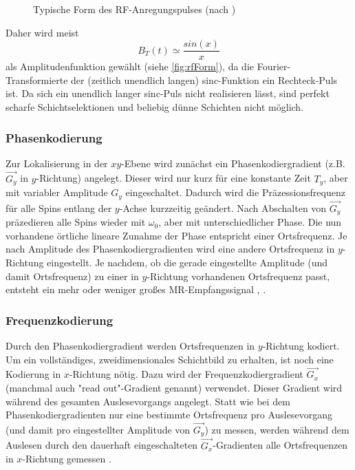 \begin{figure}[H]
	\centering
	\caption[Form des RF-Anregungspulses]{Typische Form des RF-Anregungspulses (nach \cite[S.~326]{Doessel2016})}
	\label{fig:rfForm}
\end{figure}

Daher wird meist
\begin{equation}
	B_T(t) \simeq \frac{sin(x)}{x}
\end{equation}
als Amplitudenfunktion gewählt (siehe \autoref{fig:rfForm}), da die Fourier-Transformierte der (zeitlich unendlich langen) sinc-Funktion ein Rechteck-Puls ist. Da sich ein unendlich langer sinc-Puls nicht realisieren lässt, sind perfekt scharfe Schichtselektionen und beliebig dünne Schichten nicht möglich.

\subsubsection{Phasenkodierung}
Zur Lokalisierung in der $xy$-Ebene wird zunächst ein Phasenkodiergradient (z.B. $\vec{G_y}$ in $y$-Richtung) angelegt. Dieser wird nur kurz für eine konstante Zeit $T_y$, aber mit variabler Amplitude $G_y$ eingeschaltet. Dadurch wird die Präzessionsfrequenz für alle Spins entlang der $y$-Achse kurzzeitig geändert. Nach Abschalten von $\vec{G_y}$ präzedieren alle Spins wieder mit $\omega_0$, aber mit unterschiedlicher Phase. Die nun vorhandene örtliche lineare Zunahme der Phase entspricht einer Ortsfrequenz. Je nach Amplitude des Phasenkodiergradienten wird eine andere Ortsfrequenz in $y$-Richtung eingestellt. Je nachdem, ob die gerade eingestellte Amplitude (und damit Ortsfrequenz) zu einer in $y$-Richtung vorhandenen Ortsfrequenz passt, entsteht ein mehr oder weniger großes MR-Empfangssignal \cite{Bushong2014}, \cite{Edelstein1980}.

\subsubsection{Frequenzkodierung}
Durch den Phasenkodiergradient werden Ortsfrequenzen in $y$-Richtung kodiert. Um ein vollständiges, zweidimensionales Schichtbild zu erhalten, ist noch eine Kodierung in $x$-Richtung nötig. Dazu wird der Frequenzkodiergradient $\vec{G_x}$ (manchmal auch "read out"-Gradient genannt) verwendet. Dieser Gradient wird während des gesamten Auslesevorgangs angelegt. Statt wie bei dem Phasenkodiergradienten nur eine bestimmte Ortsfrequenz pro Auslesevorgang (und damit pro eingestellter Amplitude von $\vec{G_y}$) zu messen, werden während dem Auslesen durch den dauerhaft eingeschalteten $\vec{G_x}$-Gradienten alle Ortsfrequenzen in $x$-Richtung gemessen \cite{Bushong2014}.

